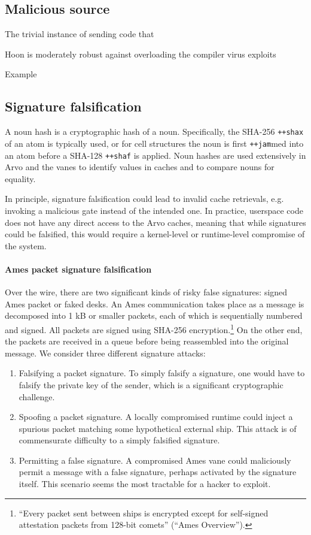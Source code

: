 \documentclass[twoside]{article}
\begin{document}
\subsection{Malicious source}

The trivial instance of sending code that 

Hoon is moderately robust against overloading the compiler
virus exploits

Example

\subsection{Signature falsification}

A noun hash is a cryptographic hash of a noun.  Specifically, the SHA-256 \lstinline[style=inlinecode]{++shax} of an atom is typically used, or for cell structures the noun is first \lstinline[style=inlinecode]{++jam}med into an atom before a SHA-128 \lstinline[style=inlinecode]{++shaf} is applied.  Noun hashes are used extensively in Arvo and the vanes to identify values in caches and to compare nouns for equality.

In principle, signature falsification could lead to invalid cache retrievals, e.g. invoking a malicious gate instead of the intended one.  In practice, userspace code does not have any direct access to the Arvo caches, meaning that while signatures could be falsified, this would require a kernel-level or runtime-level compromise of the system.

\paragraph{Ames packet signature falsification}
Over the wire, there are two significant kinds of risky false signatures:  signed Ames packet or faked desks.  An Ames communication takes place as a message is decomposed into 1 kB or smaller packets, each of which is sequentially numbered and signed.  All packets are signed using SHA-256 encryption.\footnote{“Every packet sent between ships is encrypted except for self-signed attestation packets from 128-bit comets” (“Ames  Overview”).}  On the other end, the packets are received in a queue before being reassembled into the original message.  We consider three different signature attacks:

\begin{enumerate}
  \item  Falsifying a packet signature.  To simply falsify a signature, one would have to falsify the private key of the sender, which is a significant cryptographic challenge.
  \item  Spoofing a packet signature.  A locally compromised runtime could inject a spurious packet matching some hypothetical external ship.  This attack is of commensurate difficulty to a simply falsified signature.
  \item  Permitting a false signature.  A compromised Ames vane could maliciously permit a message with a false signature, perhaps activated by the signature itself.  This scenario seems the most tractable for a hacker to exploit.
\end{enumerate}
\end{document}
